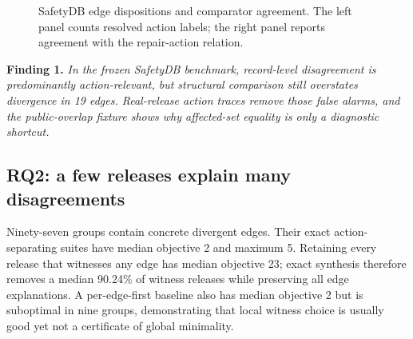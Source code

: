 \documentclass[10pt,conference]{IEEEtran}
\newcommand{\figsmall}{\rmfamily\footnotesize}
\begin{document}
\begin{figure}[t]
\centering
{}
\caption{SafetyDB edge dispositions and comparator agreement. The left panel counts resolved action labels; the right panel reports agreement with the repair-action relation.}
\label{fig:safety}
\end{figure}

\textbf{Finding 1.} \emph{In the frozen SafetyDB benchmark, record-level disagreement is predominantly action-relevant, but structural comparison still overstates divergence in 19 edges. Real-release action traces remove those false alarms, and the public-overlap fixture shows why affected-set equality is only a diagnostic shortcut.}

\subsection{RQ2: a few releases explain many disagreements}
Ninety-seven groups contain concrete divergent edges. Their exact action-separating suites have median objective 2 and maximum 5. Retaining every release that witnesses any edge has median objective 23; exact synthesis therefore removes a median 90.24\% of witness releases while preserving all edge explanations. A per-edge-first baseline also has median objective 2 but is suboptimal in nine groups, demonstrating that local witness choice is usually good yet not a certificate of global minimality.
\end{document}
